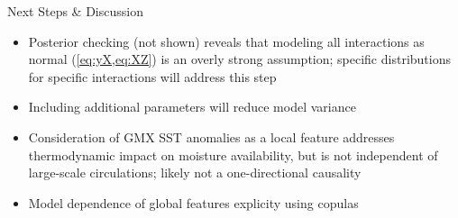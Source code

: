 \begin{block}{Next Steps \& Discussion}
    \begin{itemize}
        \item Posterior checking (not shown) reveals that modeling all interactions as normal (\cref{eq:yX,eq:XZ}) is an overly strong assumption; specific distributions for specific interactions will address this step
        \item Including additional parameters will reduce model variance
        \item Consideration of GMX SST anomalies as a local feature addresses thermodynamic impact on moisture availability, but is not independent of large-scale circulations; likely not a one-directional causality
        \item Model dependence of global features explicity using copulas \cite[\ie][]{Genest2007}
    \end{itemize}
\end{block}

